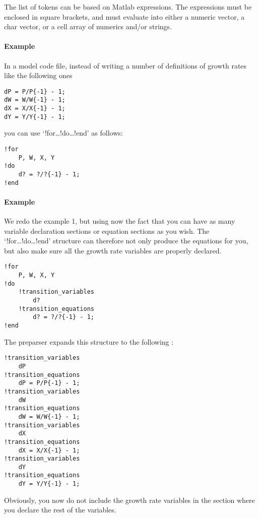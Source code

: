 The list of tokens can be based on Matlab expressions. The expressions
must be enclosed in square brackets, and must evaluate into either a
numeric vector, a char vector, or a cell array of numerics and/or
strings.

\paragraph{Example}

In a model code file, instead of writing a number of definitions of
growth rates like the following ones

\begin{verbatim}
dP = P/P{-1} - 1;
dW = W/W{-1} - 1;
dX = X/X{-1} - 1;
dY = Y/Y{-1} - 1;
\end{verbatim}

you can use `!for\ldots{}!do\ldots{}!end' as follows:

\begin{verbatim}
!for
    P, W, X, Y
!do
    d? = ?/?{-1} - 1;
!end
\end{verbatim}

\paragraph{Example}

We redo the example 1, but using now the fact that you can have as many
variable declaration sections or equation sections as you wish. The
`!for\ldots{}!do\ldots{}!end' structure can therefore not only produce
the equations for you, but also make sure all the growth rate variables
are properly declared.

\begin{verbatim}
!for
    P, W, X, Y
!do
    !transition_variables
        d?
    !transition_equations
        d? = ?/?{-1} - 1;
!end
\end{verbatim}

The preparser expands this structure to the following :

\begin{verbatim}
!transition_variables
    dP
!transition_equations
    dP = P/P{-1} - 1;
!transition_variables
    dW
!transition_equations
    dW = W/W{-1} - 1;
!transition_variables
    dX
!transition_equations
    dX = X/X{-1} - 1;
!transition_variables
    dY
!transition_equations
    dY = Y/Y{-1} - 1;
\end{verbatim}

Obviously, you now do not include the growth rate variables in the
section where you declare the rest of the variables.

